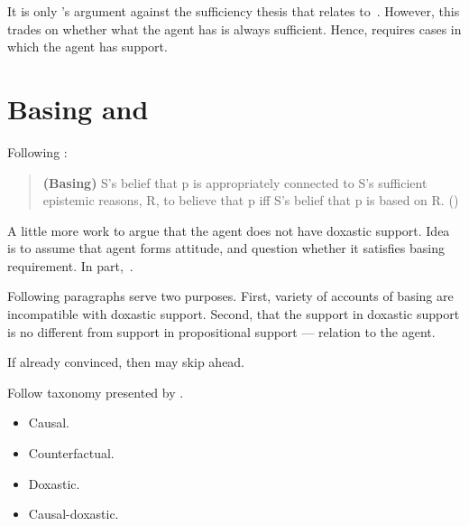 It is only \citeauthor{Littlejohn:2018uq}'s argument against the sufficiency thesis that relates to~\ESU{}.
However, this trades on whether what the agent has is always sufficient.
Hence, requires cases in which the agent has support.




\section{Basing and \ESU{}}

\begin{note}[Basing]
  Following \citeauthor{Silva:2020aa}:
  \begin{quote}
    \textbf{(Basing)} S's belief that p is appropriately connected to S's sufficient epistemic reasons, R, to believe that p iff S's belief that p is based on R.\linebreak
    \mbox{}\hfill\mbox{(\citeyear{Silva:2020aa})}
  \end{quote}
\end{note}


\begin{note}
  A little more work to argue that the agent does not have doxastic support.
  Idea is to assume that agent forms attitude, and question whether it satisfies basing requirement.
  In part,~\ESU{}.
\end{note}

\begin{note}
  Following paragraphs serve two purposes.
  First, variety of accounts of basing are incompatible with doxastic support.
  Second, that the support in doxastic support is no different from support in propositional support --- relation to the agent.

  If already convinced, then may skip ahead.
\end{note}

\begin{note}
  Follow taxonomy presented by \textcite{Korcz:2021ue}.
  \begin{itemize}
  \item Causal.
  \item Counterfactual.
  \item Doxastic.
  \item Causal-doxastic.
  \end{itemize}
\end{note}

